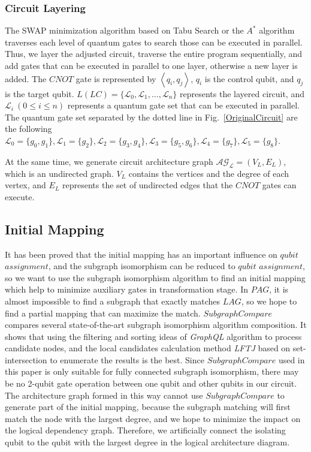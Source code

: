 \documentclass[runningheads]{llncs}
\begin{document}
\subsubsection{Circuit Layering}
The SWAP minimization algorithm based on Tabu Search or the $A^{*}$ algorithm 
traverses each level of quantum gates to search those can be executed in parallel.
Thus, we layer the adjusted circuit, 
traverse the entire program sequentially, 
and add gates that can be executed in parallel to one layer, 
otherwise a new layer is added. 
The $CNOT$ gate is represented by $\left \langle  q_{i}, q_{j} \right \rangle $, $q_{i}$ is the control qubit, 
and $q_{j}$ is the target qubit.
$L(LC)=\{\mathcal{L}_{0},\mathcal{L}_{1},...,\mathcal{L}_{n}\}$ represents the layered circuit, and
$\mathcal{L}_{i} \ (0 \le i \le n) $ represents a quantum gate set that can be executed in parallel.
The quantum gate set separated by the dotted line in Fig.~\ref{OriginalCircuit} are the following
 $\mathcal{L}_{0}=\{g_{0},g_{1}\},\mathcal{L}_{1}=\{g_{2}\},
 \mathcal{L}_{2}=\{g_{3},g_{4}\},\mathcal{L}_{3}=\{g_{5},g_{6}\},\mathcal{L}_{4}=\{g_{7}\},\mathcal{L}_{5}=\{g_{8}\}$.

At the same time, we generate circuit architecture graph $\mathcal{AG_{L}}=(V_{L},E_{L})$,
 which is an undirected graph. $V_{L}$ contains the vertices and the degree of each vertex, 
and $E_{L}$ represents the set of undirected edges that the $CNOT$ gates can execute.
\subsection{Initial Mapping}
It has been proved that the initial mapping has an important influence on $qubit$  
$ assignment$, 
and the subgraph isomorphism can be reduced to $qubit$ $ assignment$, so we want to use the subgraph 
isomorphism algorithm to find an initial mapping which help to minimize auxiliary gates in transformation stage.
In $PAG$, it is almost impossible to find a subgraph that exactly 
matches $LAG$, so we hope to find a partial mapping that can maximize the match. 
$SubgraphCompare$~\cite{Sun2020} compares several state-of-the-art subgraph isomorphism algorithm composition. 
It shows that using the filtering and sorting ideas of \emph{GraphQL} algorithm to process 
candidate nodes, and the local candidates calculation method \emph{LFTJ} based on 
set-intersection to enumerate the results is the best.
Since $SubgraphCompare$ used in this paper is only suitable for 
fully connected subgraph isomorphism, 
there may be no 2-qubit gate operation between one qubit and other qubits in our circuit.
 The architecture graph formed in this way cannot use $SubgraphCompare$ 
to generate part of the initial mapping, 
 because the subgraph matching will first match the node with the largest degree, 
 and we hope to minimize the impact on the logical dependency graph. 
 Therefore, we artificially connect the isolating qubit to the qubit with 
 the largest degree in the logical architecture diagram.
\end{document}
